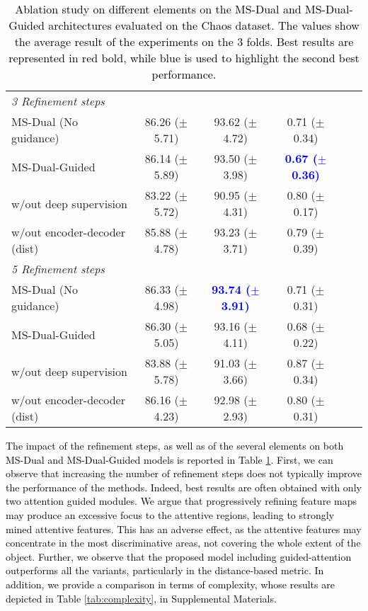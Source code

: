 \documentclass[journal]{IEEEtran}
\begin{document}
\begin{table}[ht!]
\begin{tabular}{lcccc|c}
\midrule
\multicolumn{4}{l}{\textit{3 Refinement steps}} \\
MS-Dual (No guidance)  &  86.26 ($\pm$5.71) & 93.62 ($\pm$4.72) & 0.71 ($\pm$0.34)\\
MS-Dual-Guided   & 86.14 ($\pm$5.89)  & 93.50 ($\pm$3.98)& \textcolor{blue}{\textbf{0.67 ($\pm$0.36)}} \\
w/out deep supervision   & 83.22 ($\pm$5.72)& 90.95 ($\pm$4.31)& 0.80 ($\pm$0.17)\\
w/out encoder-decoder (dist)  &  85.88 ($\pm$4.78) & 93.23 ($\pm$3.71) &  0.79 ($\pm$0.39)\\
\midrule
\multicolumn{4}{l}{\textit{5 Refinement steps}} \\
MS-Dual (No guidance)  & 86.33 ($\pm$4.98)  &  \textcolor{blue}{\textbf{93.74 ($\pm$3.91)}} & 0.71 ($\pm$0.31)\\
MS-Dual-Guided   & 86.30 ($\pm$5.05)  & 93.16 ($\pm$4.11)& 0.68 ($\pm$0.22) \\
w/out deep supervision   & 83.88 ($\pm$5.78) & 91.03 ($\pm$3.66) & 0.87 ($\pm$0.34)\\
w/out encoder-decoder (dist)  & 86.16 ($\pm$4.23) &  92.98 ($\pm$2.93) & 0.80 ($\pm$0.31) \\
\midrule
\end{tabular}
\caption{\textcolor{black}{Ablation study on different elements on the MS-Dual and MS-Dual-Guided architectures evaluated on the Chaos dataset. The values show the average result of the experiments on the 3 folds. Best results are represented in red bold, while blue is used to highlight the second best performance.}}
\label{table:metrics_ablation2}
\end{table}

\textcolor{black}{The impact of the refinement steps, as well as of the several elements on both MS-Dual and MS-Dual-Guided models is reported in Table \ref{table:metrics_ablation2}. First, we can observe that increasing the number of refinement steps does not typically improve the performance of the methods. Indeed, best results are often obtained with only two attention guided modules. We argue that progressively refining feature maps may produce an excessive focus to the attentive regions, leading to strongly mined attentive features. This has an adverse effect, as the attentive features may concentrate in the most discriminative areas, not covering the whole extent of the object. Further, we observe that the proposed model including guided-attention outperforms all the variants, particularly in the distance-based metric. In addition, we provide a comparison in terms of complexity, whose results are depicted in Table \ref{tab:complexity}, in Supplemental Materials.}
\end{document}
